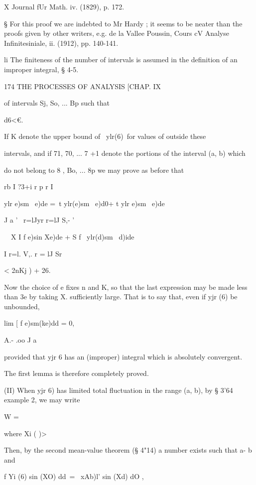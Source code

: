X Journal fUr Math. iv. (1829), p. 172.

§ For this proof we are indebted to Mr Hardy ; it seems to be neater
than the proofs given by other writers, e.g. de la Vallee Poussin,
Cours cV Analyse Infinitesiniale, ii. (1912), pp. 140-141.

li The finiteness of the number of intervals is assumed in the
definition of an improper integral, § 4-5.



174 THE PROCESSES OF ANALYSIS [CHAP. IX

of intervals Sj, So, ... Bp such that

d6<€.






If K denote the upper bound of \ ylr(6)\ for values of outside these

intervals, and if 71, 70, ... 7 +1 denote the portions of the interval
(a, b) which

do not belong to 8 , Bo, ... 8p we may prove as before that

rb I ?3+i r p r I

ylr e)sm \ e)de =\ t ylr(e)sm \ e)d0+ t ylr e)sm \ e)de\

J a ' \ r=lJyr r=lJ S,- '

 \ \ X I f e)sin Xe)de + S f \ ylr(d)sm \ d)ide

I r=l. V,. r = lJ Sr

< 2nKj ) + 26.

Now the choice of e fixes n and K, so that the last expression may be
made less than 3e by taking X. sufficiently large. That is to say
that, even if yjr (6) be unbounded,

lim [ f e)sm(ke)dd = 0,

A.- .oo J a

provided that yjr 6 has an (improper) integral which is absolutely
convergent.

The first lemma is therefore completely proved.

(II) When yjr 6) has limited total fluctuation in the range (a, b), by
§ 3'64 example 2, we may write

 W = %

where Xi ( )> %

Then, by the second mean-value theorem (§ 4"14) a number exists such
that a- b and

f Yi (6) sin (XO) dd\ = \ xAb)l' sin (Xd) dO ,

